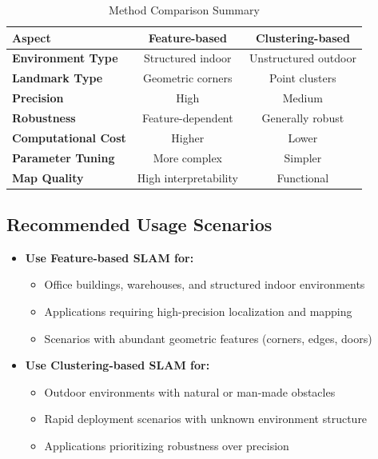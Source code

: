 \documentclass[12pt,a4paper]{article}
\begin{document}
\begin{table}[H]
\centering
\caption{Method Comparison Summary}
\begin{tabular}{@{}lcc@{}}
\toprule
\textbf{Aspect} & \textbf{Feature-based} & \textbf{Clustering-based} \\
\midrule
\textbf{Environment Type} & Structured indoor & Unstructured outdoor \\
\textbf{Landmark Type} & Geometric corners & Point clusters \\
\textbf{Precision} & High & Medium \\
\textbf{Robustness} & Feature-dependent & Generally robust \\
\textbf{Computational Cost} & Higher & Lower \\
\textbf{Parameter Tuning} & More complex & Simpler \\
\textbf{Map Quality} & High interpretability & Functional \\
\bottomrule
\end{tabular}
\end{table}

\subsection{Recommended Usage Scenarios}

\begin{itemize}
    \item \textbf{Use Feature-based SLAM for:}
    \begin{itemize}
        \item Office buildings, warehouses, and structured indoor environments
        \item Applications requiring high-precision localization and mapping
        \item Scenarios with abundant geometric features (corners, edges, doors)
    \end{itemize}

    \item \textbf{Use Clustering-based SLAM for:}
    \begin{itemize}
        \item Outdoor environments with natural or man-made obstacles
        \item Rapid deployment scenarios with unknown environment structure
        \item Applications prioritizing robustness over precision
    \end{itemize}
\end{itemize}
\end{document}

